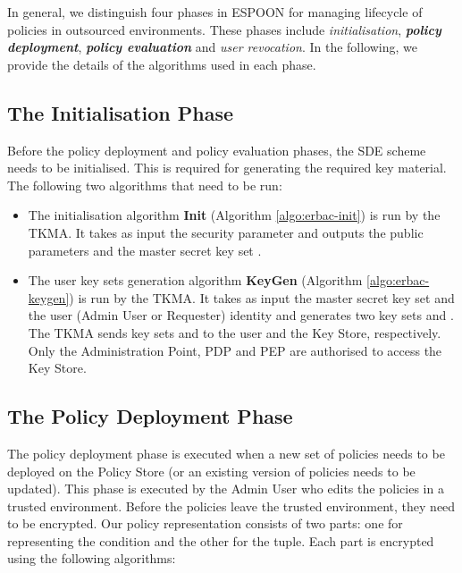 \documentclass[epsfig,a4paper,11pt,titlepage]{book}
\numberwithin{algorithm}{chapter}
\begin{document}
In general, we distinguish four phases in \gls{ESPOON} for managing lifecycle of policies in outsourced environments. These phases include \emph{initialisation}, \emph{\textbf{policy deployment}}, \emph{\textbf{policy evaluation}} and \emph{user revocation}. In the following, we provide the details of the algorithms used in each phase.

\subsection{The Initialisation Phase}
Before the policy deployment and policy evaluation phases, the \gls{SDE} scheme needs to be initialised. This is required for generating the required key material. The following two algorithms that need to be run:

\begin{itemize}

\item The initialisation algorithm \textbf{Init} (Algorithm \ref{algo:erbac-init}) is run by the \gls{TKMA}. It takes as input the security parameter  and outputs the public parameters  and the master secret key set .

\item The user key sets generation algorithm \textbf{KeyGen} (Algorithm \ref{algo:erbac-keygen}) is run by the \gls{TKMA}. It takes as input the master secret key set  and the user (Admin User or Requester) identity  and generates two key sets  and . The \gls{TKMA} sends key sets  and  to the user  and the Key Store, respectively. Only the Administration Point, \gls{PDP} and \gls{PEP} are authorised to access the Key Store.

\end{itemize}

\subsection{The Policy Deployment Phase}
The policy deployment phase is executed when a new set of policies needs to be deployed on the Policy Store (or an existing version of policies needs to be updated). This phase is executed by the Admin User who edits the policies in a trusted environment. Before the policies leave the trusted environment, they need to be encrypted. Our policy representation consists of two parts: one for representing the condition and the other for the  tuple. Each part is encrypted using the following algorithms:
\end{document}
